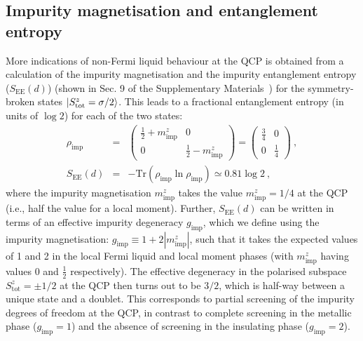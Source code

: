 \documentclass{iopart}
\begin{document}
\subsection{Impurity magnetisation and entanglement entropy}
More indications of non-Fermi liquid behaviour at the QCP is obtained from a calculation of the impurity magnetisation and the impurity entanglement entropy (\(S_\text{EE}(d)\)) (shown in Sec. 9 of the Supplementary Materials~\cite{supp_mat}) for the symmetry-broken states \(\ket{S_\text{tot}^z = \sigma/2}\). This 
leads to a fractional entanglement entropy (in units of \(\log 2\)) for each of the two states:
\begin{eqnarray}
	\rho_\text{imp} &=& \begin{pmatrix} \frac{1}{2} + m_\text{imp}^z & 0 \\ 0 & \frac{1}{2} - m_\text{imp}^z \end{pmatrix} = \begin{pmatrix} \frac{3}{4} & 0 \\ 0 & \frac{1}{4} \end{pmatrix}~,\nonumber\\ 
	S_\text{EE}(d) &=& -\text{Tr}\left(\rho_\text{imp} \ln \rho_\text{imp}\right) \simeq 0.81 \log 2~,
\end{eqnarray}
where the impurity magnetisation \(m_\text{imp}^z\) takes the value \(m_\text{imp}^z = 1/4\) at the QCP (i.e., half the value for a local moment).
Further, \(S_\text{EE}(d)\) can be written in terms of an effective impurity degeneracy \(g_\text{imp}\), which we define using the impurity magnetisation: \(g_\text{imp} \equiv 1 + 2|m_\text{imp}^z|\), such that it takes the  expected values of 1 and 2 in the local Fermi liquid and local moment phases (with \(m_\text{imp}^z\) having values 0 and \(\frac{1}{2}\) respectively). The effective degeneracy in the polarised subspace \(S_\text{tot}^z = \pm 1/2\) at the QCP then turns out to be \(3/2\), which is half-way between a unique state and a doublet. This corresponds to partial screening of the impurity degrees of freedom at the QCP, in contrast to complete screening in the metallic phase (\(g_\text{imp} = 1\)) and the absence of screening in the insulating phase (\(g_\text{imp} = 2\)).
\end{document}
